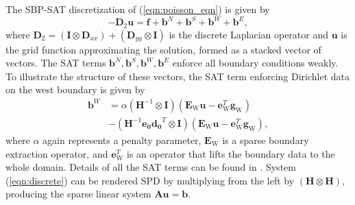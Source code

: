  
The SBP-SAT discretization of (\ref{eqn:poisson_eqn}) is given by
\begin{equation}\label{eqn:discrete}
-\boldsymbol{D}_2\boldsymbol{u} = \boldsymbol{f} + \boldsymbol{b}^{N} + \boldsymbol{b}^{S} + \boldsymbol{b}^{W} + \boldsymbol{b}^{E},
\end{equation}
%
where $\boldsymbol{D}_2 = \left(\boldsymbol{I} \otimes \boldsymbol{D}_{xx}\right) +  \left(\boldsymbol{D}_{yy}  \otimes \boldsymbol{I}\right)$ is the discrete Laplacian operator and $\boldsymbol{u}$ is the grid function approximating the solution, formed as a stacked vector of vectors. The SAT terms $\boldsymbol{b}^{N}, \boldsymbol{b}^{S}, \boldsymbol{b}^{W}, \boldsymbol{b}^{E}$ enforce all boundary conditions weakly. To illustrate the structure of these vectors, the SAT term enforcing Dirichlet data on the west boundary is given by 
\begin{align}
\boldsymbol{b}^{W} &= \alpha \left(\boldsymbol{H}^{-1} \otimes \boldsymbol{I}\right) (\boldsymbol{E}_\text{W}\boldsymbol{u} - \boldsymbol{e}^T_\text{W}\boldsymbol{g}_\text{W}) \\ 
&- \left(\boldsymbol{H}^{-1}\boldsymbol{e_0}\boldsymbol{d_0}^T \otimes \boldsymbol{I}\right) (\boldsymbol{E}_\text{W}\boldsymbol{u} - \boldsymbol{e}^T_\text{W}\boldsymbol{g}_\text{W}),
\end{align}
where $\alpha$ again represents a penalty parameter, $\boldsymbol{E}_\text{W}$ is a sparse boundary extraction operator, and $\boldsymbol{e}^T_\text{W}$ is an operator that lifts the boundary data to the whole domain. Details of all the SAT terms can be found in \cite{Erickson2014}.
System (\ref{eqn:discrete}) can be rendered SPD by multiplying from the left by $\left(\boldsymbol{H} \otimes \boldsymbol{H}\right)$,  producing the sparse linear system $\boldsymbol{Au} = \boldsymbol{b}$.